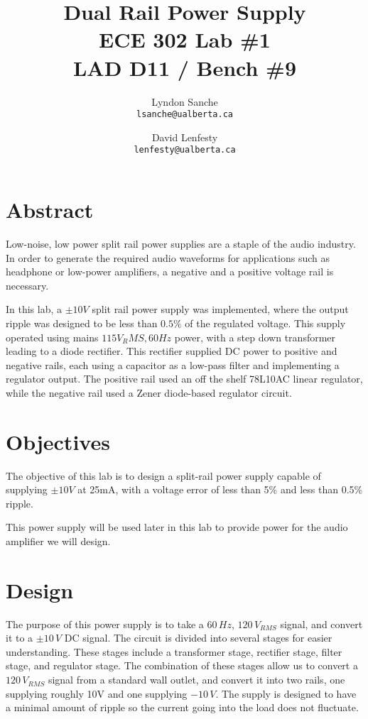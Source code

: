 \documentclass[12pt]{article}
\title{ {\Huge Dual Rail Power Supply } \\
    ECE 302 Lab \#1 \\ LAD D11 / Bench \#9}
\author{
    Lyndon Sanche\\
    \texttt{lsanche@ualberta.ca}
    \and
    David Lenfesty\\
    \texttt{lenfesty@ualberta.ca}
}
\begin{document}

\maketitle


\section{Abstract}

Low-noise, low power split rail power supplies are a staple of the audio industry.
In order to generate the required audio waveforms for applications such as headphone or
low-power amplifiers, a negative and a positive voltage rail is necessary.

In this lab, a $\pm 10 V$ split rail power supply was implemented,
where the output ripple was designed to be less than $ 0.5 \% $ of the
regulated voltage. This supply operated using mains $115 V_RMS, 60Hz $ power, with
a step down transformer leading to a diode rectifier. This rectifier supplied DC power to
positive and negative rails, each using a capacitor as a low-pass filter and implementing
a regulator output. The positive rail used an off the shelf 78L10AC linear regulator,
while the negative rail used a Zener diode-based regulator circuit.

\newpage
{}

\section{Objectives}

The objective of this lab is to design a split-rail power supply capable of supplying
$\pm 10V$ at 25mA, with a voltage error of less than 5\% and less than 0.5\% ripple.

This power supply will be used later in this lab to provide power for the audio amplifier
we will design.

\section{Design}
The purpose of this power supply is to take a $60\,Hz$, $120\,V_{RMS}$ signal, and convert it to a $\pm10\,V$ DC signal. The circuit is divided into
several stages for easier understanding. These stages include a transformer stage, rectifier stage, filter stage, and regulator stage. The combination 
of these stages allow us to convert a $120\,V_{RMS}$ signal from a standard wall outlet, and convert it into two rails, one supplying roughly 10V and one supplying $-10\,V$. 
The supply is designed to have a minimal amount of ripple so the current going into the load does not fluctuate.
\end{document}
